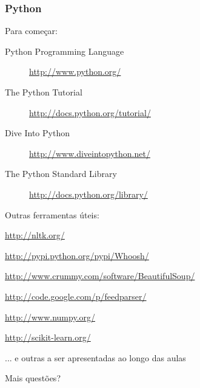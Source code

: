 \documentclass{beamer}
\begin{document}
\begin{frame}
    \frametitle{Python}    
    \begin{block}{Para começar:}
        \footnotesize
        \begin{description}
        \item[Python Programming Language] \url{http://www.python.org/}
        \item[The Python Tutorial] \url{http://docs.python.org/tutorial/}
        \item[Dive Into Python] \url{http://www.diveintopython.net/}
        \item[The Python Standard Library] \url{http://docs.python.org/library/}
        \end{description}
    \end{block}
    \begin{block}{Outras ferramentas úteis:}
        \footnotesize
        \begin{description}
        \item[Natural Language Toolkit] \url{http://nltk.org/}
        \item[Whoosh] \url{http://pypi.python.org/pypi/Whoosh/}
        \item[Beautiful Soup] \url{http://www.crummy.com/software/BeautifulSoup/}
        \item[feedparser] \url{http://code.google.com/p/feedparser/}
        \item[NumPy] \url{http://www.numpy.org/}
        \item[scikit-learn] \url{http://scikit-learn.org/}
        \item ... e outras a ser apresentadas ao longo das aulas
        \end{description}
    \end{block}
\end{frame}

\begin{frame}
    \begin{block}{}
        \centering
        \Large
        Mais questões?
    \end{block}
\end{frame}
\end{document}
